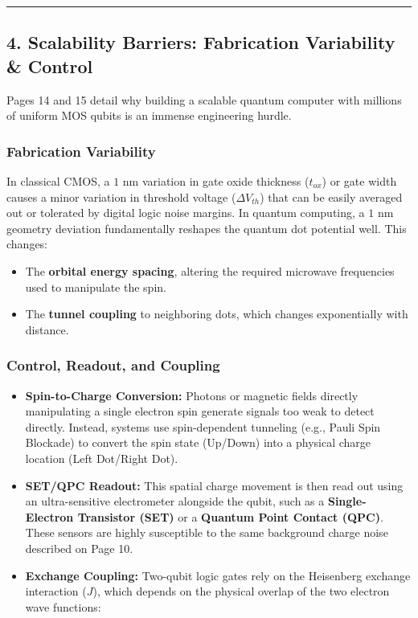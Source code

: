 \documentclass[
]{article}
\providecommand{\tightlist}{%
  \setlength{\itemsep}{0pt}\setlength{\parskip}{0pt}}
\begin{document}
\begin{center}\rule{0.5\linewidth}{0.5pt}\end{center}

\subsection{4. Scalability Barriers: Fabrication Variability \&
Control}\label{scalability-barriers-fabrication-variability-control}

Pages 14 and 15 detail why building a scalable quantum computer with
millions of uniform MOS qubits is an immense engineering hurdle.

\subsubsection{Fabrication Variability}\label{fabrication-variability}

In classical CMOS, a \(1\text{ nm}\) variation in gate oxide thickness
(\(t_{ox}\)) or gate width causes a minor variation in threshold voltage
(\(\Delta V_{th}\)) that can be easily averaged out or tolerated by
digital logic noise margins. In quantum computing, a \(1\text{ nm}\)
geometry deviation fundamentally reshapes the quantum dot potential
well. This changes:

\begin{itemize}
\tightlist
\item
  The \textbf{orbital energy spacing}, altering the required microwave
  frequencies used to manipulate the spin.
\item
  The \textbf{tunnel coupling} to neighboring dots, which changes
  exponentially with distance.
\end{itemize}

\subsubsection{Control, Readout, and
Coupling}\label{control-readout-and-coupling}

\begin{itemize}
\tightlist
\item
  \textbf{Spin-to-Charge Conversion:} Photons or magnetic fields
  directly manipulating a single electron spin generate signals too weak
  to detect directly. Instead, systems use spin-dependent tunneling
  (e.g., Pauli Spin Blockade) to convert the spin state (Up/Down) into a
  physical charge location (Left Dot/Right Dot).
\item
  \textbf{SET/QPC Readout:} This spatial charge movement is then read
  out using an ultra-sensitive electrometer alongside the qubit, such as
  a \textbf{Single-Electron Transistor (SET)} or a \textbf{Quantum Point
  Contact (QPC)}. These sensors are highly susceptible to the same
  background charge noise described on Page 10.
\item
  \textbf{Exchange Coupling:} Two-qubit logic gates rely on the
  Heisenberg exchange interaction (\(J\)), which depends on the physical
  overlap of the two electron wave functions:
\end{itemize}
\end{document}
